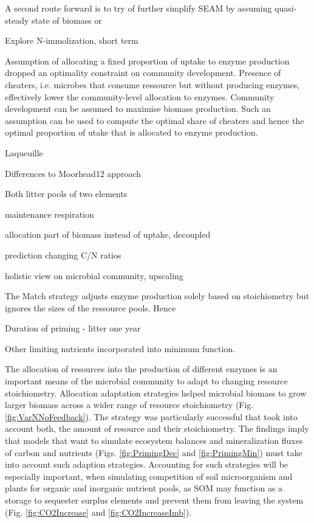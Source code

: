 A second route forward is to try of further simplify SEAM by assuming
quasi-steady state of biomass or 

Explore N-immolization, short term


Assumption of allocating a fixed proportion of uptake to enzyme production
dropped an optimality constraint on community development. Presence of cheaters,
i.e. microbes that consume ressource but without producing enzymes, effectively
lower the community-level allocation to enzymes. Community development
can be assumed to maximise biomass production. Such an assumption can be
used to compute the optimal share of cheaters and hence the optimal
proportion of utake that is allocated to enzyme production. 
 
Laqueuille

Differences to Moorhead12 approach

Both litter pools of two elements

maintenance respiration

allocation part of biomass instead of uptake, decoupled

prediction changing C/N ratios

holistic view on microbial community, upscaling


The Match strategy adjusts enzyme production solely based on stoichiometry but
ignores the sizes of the ressource pools. Hence

Duration of priming - litter one year

Other limiting nutrients incorporated into minimum function.


\conclusions  
 
The allocation of resources into the production of different enzymes is an
important means of the microbial community to adapt to changing resource
stoichiometry. Allocation adaptation strategies helped microbial biomass to grow
larger biomass across a wider range of resource stoichiometry (Fig.
\ref{fig:VarNNoFeedback}). The strategy was particularly successful that took
into account both, the amount of resource and their stoichiometry.
The findings imply that models that want to simulate ecosystem balances and
mineralization fluxes of carbon and nutrients (Figs. \ref{fig:PrimingDec} and
\ref{fig:PrimingMin}) must take into account such adaption strategies.
Accounting for such strategies will be especially important, when simulating
competition of soil microorganism and plants for organic and inorganic nutrient
pools, as SOM may function as a storage to sequester surplus elements and
prevent them from leaving the system (Fig. \ref{fig:CO2Increase} and
\ref{fig:CO2IncreaseImb}).


